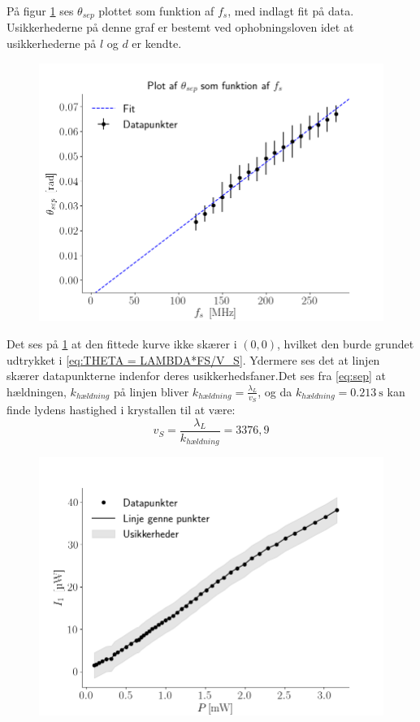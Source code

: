 \documentclass[main]{subfiles}
\begin{document}
På figur \cref{fig:graf1} ses $\theta_{sep}$ plottet som funktion af $f_s$, med indlagt fit på data. Usikkerhederne på denne graf er bestemt ved ophobningsloven idet at usikkerhederne på $l$ og $d$ er kendte.
\begin{figure}[H]
    \centering
    \includegraphics[width=\linewidth]{tegninger/graf1.png}
    \caption{}
    \label{fig:graf1}
\end{figure}
Det ses på \cref{fig:graf1} at den fittede kurve ikke skærer i $(0,0)$, hvilket den burde grundet udtrykket i \cref{eq:THETA = LAMBDA*FS/V_S}.%
Ydermere ses det at linjen skærer datapunkterne indenfor deres usikkerhedsfaner.Det ses fra \cref{eq:sep} at hældningen, $k_{hældning}$ på linjen bliver $ k_{hældning} = \frac{\lambda_L}{v_S}$, og da $k_{hældning} = \SI{0,213}{\second}$ kan finde lydens hastighed i krystallen til at være:
\begin{equation}
  \nonumber v_S = \frac{\lambda_L}{k_{hældning}} = 3376,9
\end{equation}



\begin{figure}[H]
    \centering
    \includegraphics[width=\linewidth]{tegninger/graf2.png}
    \caption{}
    \label{fig:graf2}
\end{figure}
\end{document}
